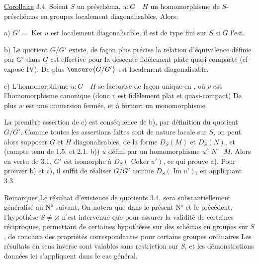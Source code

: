 \uline{Corollaire} 3.4. Soient $S$ un préschéma, $u:G\quad H$ un homomorphisme de  $S$-préschémas en groupes localement diagonalisables, Alors:

a) $G'=\operatorname{Ker}u$ est localement diagonalisable, il est de type fini sur $S$ si $G$ l'est.

b) Le quotient $G/G'$ existe, de façon plus précise la relation d'équivalence définie par $G'$ dans $G$ est effective pour la descente fidèlement plate quasi-compacte (cf exposé IV). De plus $\unsure{G/G'}$ est localement diagonalisable.

c)  L'homomorphisme $u:G\quad H$ se factorise de façon unique en
, où $v$ est l'homomorphisme canonique (donc $v$ est fidèlement plat et quasi-compact) De plus $w$ est une immersion fermée, et à fortiori un monomorphisme.

La première assertion de c) est conséquence de b), par définition du quotient $G/G'$. Comme toutes les assertions faites sont de nature locale sur $S$, on peut alors supposer $G$ et $H$  diagonalisables,  de la forme $D_S(M)$ et $D_S(N)$, et (compte tenu de 1.5. et 2.1. b)) $u$ défini par un homomorphisme $u':N\quad M$. Alors en vertu de 3.1. $G'$ est isomorphe à $D_S(\operatorname{Coker}u')$, ce qui prouve a). Pour prouver b) et c), il suffit de réaliser $G/G'$ comme $D_S(\operatorname{Im}u')$, en appliquant 3.3.

\uline{Remarques} Le résultat d'existence de quotients 3.4. sera substantiellement généralisé au N° suivant,  On notera que dans le présent N° et le précédent, l'hypothèse $S\ne\varnothing$ n'est intervenue que pour assurer la validité de certaines réciproques,  permettant de certaines hypothèses sur des schémas en groupes sur $S$, de conclure des propriétés correspondantes pour certains groupes ordinaires Les résultats en sens inverse sont valables sans restriction sur $S$, et les démonstrations données ici s'appliquent dans le cas général.
